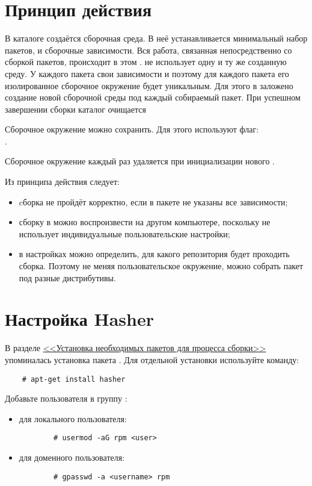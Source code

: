 \section{Принцип действия}
В каталоге  создаётся сборочная среда. В неё устанавливается минимальный набор 
пакетов,  и сборочные зависимости. Вся работа, связанная непосредственно со сборкой пакетов, 
происходит в этом .  не использует одну и ту же созданную среду. У каждого пакета 
свои зависимости и поэтому для каждого пакета его изолированное сборочное окружение будет уникальным. Для 
этого в  заложено создание новой сборочной среды под каждый собираемый пакет. При успешном 
завершении сборки каталог  очищается%

Сборочное окружение можно сохранить. Для этого используют флаг:\\ .

Сборочное окружение каждый раз удаляется при инициализации нового .

Из принципа действия  следует:
\begin{itemize}
	\item cборка не пройдёт корректно, если в пакете не указаны все зависимости;
	\item сборку в  можно воспроизвести на другом компьютере, поскольку  
		не использует индивидуальные пользовательские настройки;
	\item в настройках можно определить, для какого репозитория будет проходить сборка. Поэтому не 
		меняя пользовательское окружение, можно собрать пакет под разные дистрибутивы.
\end{itemize}


\hypertarget{5.3}{\section{Настройка Hasher}}
В разделе \hyperlink{1.3}{<<Установка необходимых пакетов для процесса сборки>>}  упоминалась 
установка пакета . Для отдельной установки используйте команду: 
\begin{verbatim}
	# apt-get install hasher
\end{verbatim}

Добавьте пользователя в группу :
\begin{itemize}
	\item для локального пользователя:
	\begin{verbatim}
		# usermod -aG rpm <user>
	\end{verbatim}
	
	\item для доменного пользователя: 
	\begin{verbatim}
		# gpasswd -a <username> rpm
	\end{verbatim}
\end{itemize} 

